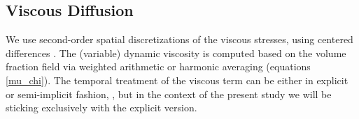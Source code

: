 \subsection*{Viscous Diffusion}
We use second-order spatial discretizations of the viscous stresses, using centered differences
. 
The (variable) dynamic viscosity is computed based on the  
volume fraction field via weighted arithmetic or harmonic averaging (equations \ref{mu_chi}). 
The temporal treatment of the viscous term can be either in explicit or semi-implicit fashion,  
, but in the context of the present study we will be sticking exclusively with the explicit version.     

